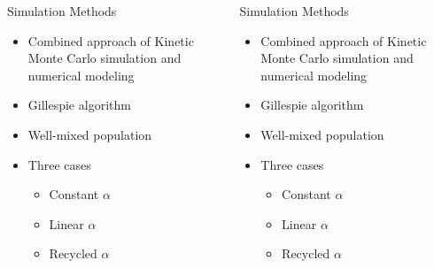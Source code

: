 \documentclass[final]{beamer}
\newlength{\sepwid}
\newlength{\onecolwid}
\begin{document}
\begin{frame}[t]
\begin{block}
\begin{columns}[t]
\begin{column}{\onecolwid}
  \begin{block}{Simulation Methods}
    \begin{itemize}
      \item Combined approach of Kinetic Monte Carlo simulation and numerical modeling
      \item Gillespie algorithm
      \item Well-mixed population
      \item Three cases
      \begin{itemize}
        \item Constant $\alpha$
        \item Linear $\alpha$
        \item Recycled $\alpha$
      \end{itemize}
    \end{itemize}
  \end{block}
\end{column}

\begin{column}{\sepwid}\end{column} %

\begin{column}{\onecolwid}
  \begin{block}{Simulation Methods}
    \begin{itemize}
      \item Combined approach of Kinetic Monte Carlo simulation and numerical modeling
      \item Gillespie algorithm
      \item Well-mixed population
      \item Three cases
      \begin{itemize}
        \item Constant $\alpha$
        \item Linear $\alpha$
        \item Recycled $\alpha$
      \end{itemize}
    \end{itemize}
  \end{block}
\end{column}
\begin{column}{\sepwid}\end{column} %
\end{columns} %
\end{block}



\end{frame}
\end{document}
